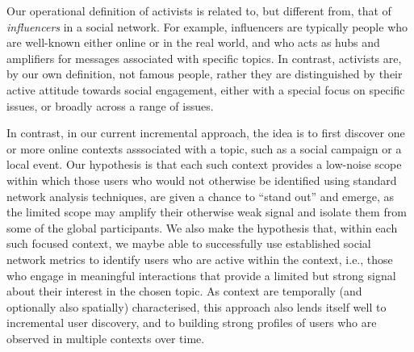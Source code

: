 \documentclass[runningheads]{llncs}
\begin{document}


Our operational definition of activists is related to, but different from, that of \textit{influencers} in a social network. 
For example, influencers are typically people who are well-known either online or in the real world, and who acts as hubs and amplifiers for messages associated with specific topics. 
In contrast, activists are, by our own definition, not famous people, rather they are distinguished by their active attitude towards social engagement, either with a special focus on specific issues, or broadly across a range of issues.



In contrast, in our current incremental approach, the idea is to first discover one or more online contexts asssociated with a topic, such as a social campaign or a local event.
Our hypothesis is that each such  context provides a low-noise scope within which those users who would not otherwise be identified using standard network analysis techniques, are given a chance to ``stand out'' and emerge, as the limited scope may amplify their otherwise weak signal and isolate them from some of the global participants.
We also make the hypothesis that, within each such focused context, we maybe able to  successfully use established social network metrics to identify users who are active within the context, i.e., those who engage in meaningful interactions that provide a limited but strong signal about their interest in the chosen topic. 
%
As context are temporally (and optionally also spatially) characterised, this approach also lends itself well to incremental user discovery,  and to building strong profiles of users who are observed in multiple contexts over time.
\end{document}
